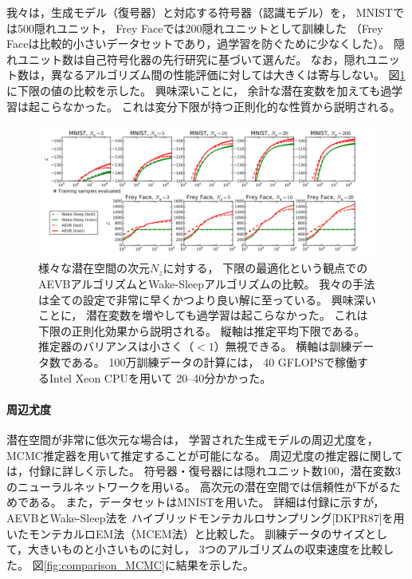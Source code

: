 \documentclass[dvipdfmx, fleqn, draft]{jsarticle}
\begin{document}
我々は，生成モデル（復号器）と対応する符号器（認識モデル）を，
MNISTでは500隠れユニット，
Frey Faceでは200隠れユニットとして訓練した
（Frey Faceは比較的小さいデータセットであり，過学習を防ぐために少なくした）。
隠れユニット数は自己符号化器の先行研究に基づいて選んだ。
なお，隠れユニット数は，異なるアルゴリズム間の性能評価に対しては大きくは寄与しない。
図\ref{fig:comparison_WakeSleep}に下限の値の比較を示した。
興味深いことに，
余計な潜在変数を加えても過学習は起こらなかった。
これは変分下限が持つ正則化的な性質から説明される。

\begin{figure}
    \centering
    \includegraphics[clip, width=15cm]{../figures/comparison_WakeSleep}
    \caption{
        様々な潜在空間の次元\(N_z\)に対する，
        下限の最適化という観点での
        AEVBアルゴリズムとWake-Sleepアルゴリズムの比較。
        我々の手法は全ての設定で非常に早くかつより良い解に至っている。
        興味深いことに，
        潜在変数を増やしても過学習は起こらなかった。
        これは下限の正則化効果から説明される。
        縦軸は推定平均下限である。
        推定器のバリアンスは小さく（\(< 1\)）無視できる。
        横軸は訓練データ数である。
        100万訓練データの計算には，
        40 GFLOPSで稼働するIntel Xeon CPUを用いて
        20--40分かかった。
        }
    \label{fig:comparison_WakeSleep}
\end{figure}


\paragraph{周辺尤度}

潜在空間が非常に低次元な場合は，
学習された生成モデルの周辺尤度を，
MCMC推定器を用いて推定することが可能になる。
周辺尤度の推定器に関しては，付録に詳しく示した。
符号器・復号器には隠れユニット数100，潜在変数3のニューラルネットワークを用いる。
高次元の潜在空間では信頼性が下がるためである。
また，データセットはMNISTを用いた。
詳細は付録に示すが，
AEVBとWake-Sleep法を
ハイブリッドモンテカルロサンプリング[DKPR87]を用いたモンテカルロEM法（MCEM法）と比較した。
訓練データのサイズとして，大きいものと小さいものに対し，
3つのアルゴリズムの収束速度を比較した。
図\ref{fig:comparison_MCMC}に結果を示した。
\end{document}

